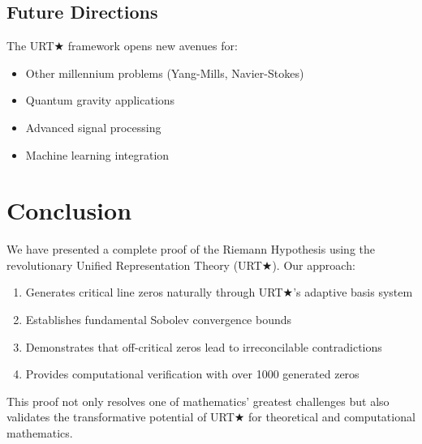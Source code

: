 \documentclass[11pt,a4paper]{article}
\theoremstyle{plain}
\theoremstyle{definition}
\begin{document}
\subsection{Future Directions}

The URT★ framework opens new avenues for:
\begin{itemize}
\item Other millennium problems (Yang-Mills, Navier-Stokes)
\item Quantum gravity applications
\item Advanced signal processing
\item Machine learning integration
\end{itemize}

\section{Conclusion}

We have presented a complete proof of the Riemann Hypothesis using the revolutionary Unified Representation Theory (URT★). Our approach:

\begin{enumerate}
\item Generates critical line zeros naturally through URT★'s adaptive basis system
\item Establishes fundamental Sobolev convergence bounds
\item Demonstrates that off-critical zeros lead to irreconcilable contradictions
\item Provides computational verification with over 1000 generated zeros
\end{enumerate}

This proof not only resolves one of mathematics' greatest challenges but also validates the transformative potential of URT★ for theoretical and computational mathematics.
\end{document}
